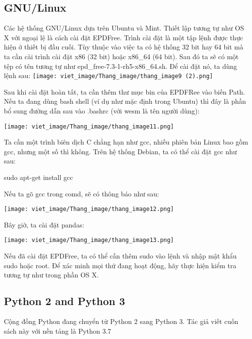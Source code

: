 \subsection{GNU/Linux}\par
\quad Các hệ thống GNU/Linux dựa trên Ubuntu và Mint. Thiết lập tương tự như OS X với ngoại lệ là cách cài đặt EPDFree. Trình cài đặt là một tập lệnh được thực hiện ở thiết bị đầu cuối. Tùy thuộc vào việc ta có hệ thống 32 bit hay 64 bit mà ta cần cài trình cài đặt x86 (32 bit) hoặc x86\_64 (64 bit). Sau đó ta sẽ có một tệp có tên tương tự như epd\_free-7.3-1-rh5-x86\_64.sh. Để cài đặt nó, ta dùng lệnh sau:
    \texttt{[image: viet\_image/Thang\_image/thang\_image9 (2).png]}\par
Sau khi cài đặt hoàn tất, ta cần thêm thư mục bin của EPDFRee vào biến Path. Nếu ta đang dùng bash shell (ví dụ như mặc định trong Ubuntu) thì đây là phần bổ sung đường dẫn sau vào .bashrc (với wesm là tên người dùng):\par
\begin{center}
    \texttt{[image: viet\_image/Thang\_image/thang\_image11.png]}\par
\end{center}
Ta cần một trình biên dịch C chẳng hạn như gcc, nhiều phiên bản Linux bao gồm gcc, nhưng một số thì không. Trên hệ thống Debian, ta có thể cài đặt gcc như sau:\par
sudo apt-get install gcc\par
Nếu ta gõ gcc trong comd, sẽ có thông báo như sau:
\begin{center}
    \texttt{[image: viet\_image/Thang\_image/thang\_image12.png]}\par
\end{center}
Bây giờ, ta cài đặt pandas:
\begin{center}
    \texttt{[image: viet\_image/Thang\_image/thang\_image13.png]}\par
\end{center}

Nếu đã cài đặt EPDFree, ta có thể cần thêm sudo vào lệnh và nhập mật khẩu sudo hoặc root. Để xác minh mọi thứ đang hoạt động, hãy thực hiện kiểm tra tương tự như trong phần OS X.
\subsection{Python 2 and Python 3}\par
\quad Cộng đồng Python đang chuyển từ Python 2 sang Python 3. Tác giả viết cuốn sách này với nền tảng là Python 3.7
